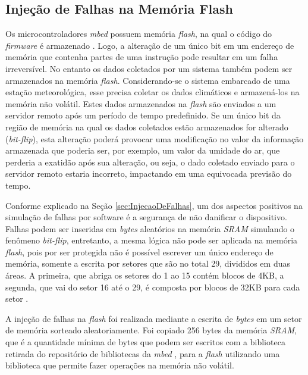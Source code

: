 \subsection{Injeção de Falhas na Memória Flash} \label{subsec:InjecaoFalhasFlash}

Os microcontroladores \textit{mbed} possuem memória \textit{flash}, na qual o código do \textit{firmware} é armazenado \cite{manualLpc176x:2016}. Logo, a alteração de um único bit em um endereço de memória que contenha partes de uma instrução pode resultar em um falha irreversível. No entanto os dados coletados por um sistema também podem ser armazenados na memória \textit{flash}. Considerando-se o sistema embarcado de uma estação meteorológica, esse precisa coletar os dados climáticos e armazená-los na memória não volátil. Estes dados armazenados na \textit{flash} são enviados a um servidor remoto após um período de tempo predefinido. Se um único bit da região de memória na qual os dados coletados estão armazenados for alterado (\textit{bit-flip}), esta alteração poderá provocar uma modificação no valor da informação armazenada que poderia ser, por exemplo, um valor da umidade do ar, que perderia a exatidão após sua alteração, ou seja, o dado coletado enviado para o servidor remoto estaria incorreto, impactando em uma equivocada previsão do tempo. 

Conforme explicado na Seção \ref{sec:InjecaoDeFalhas}, um dos aspectos positivos na simulação de falhas por software é a segurança de não danificar o dispositivo. Falhas podem ser inseridas em \textit{bytes} aleatórios na memória \textit{SRAM} simulando o fenômeno \textit{bit-flip}, entretanto, a mesma lógica não pode ser aplicada na memória \textit{flash}, pois por ser protegida não é possível escrever um único endereço de memória, somente a escrita por setores que são no total 29, divididos em duas áreas. A primeira, que abriga os setores do 1 ao 15 contém blocos de 4KB, a segunda, que vai do setor 16 até o 29, é composta por blocos de 32KB para cada setor \cite{manualLpc176x:2016}.

A injeção de falhas na \textit{flash} foi realizada mediante a escrita de \textit{bytes} em um setor de memória sorteado aleatoriamente. Foi copiado 256 bytes da memória \textit{SRAM}, que é a quantidade mínima de bytes que podem ser escritos com a biblioteca retirada do repositório de bibliotecas da \textit{mbed} \cite{escritaNaFlash:2016}, para a \textit{flash} utilizando uma biblioteca que permite fazer operações na memória não volátil. 

